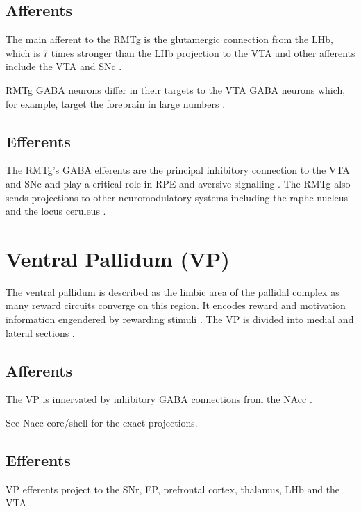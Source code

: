 \documentclass[12pt,a4paper]{article}
\begin{document}
\subsection{Afferents}

The main afferent to the RMTg is the glutamergic connection from the LHb, which is 7 times
stronger than the LHb projection to the VTA \citep{Barrot2012} and other afferents include
the VTA and SNc \citep{Lavezzi2011}.

RMTg GABA neurons differ in their targets to the VTA GABA neurons which, for example, target the forebrain in large numbers \citep{Barrot2012}. 

\subsection{Efferents}

The RMTg’s GABA efferents are the principal inhibitory connection to the VTA and SNc and play a critical role in RPE and aversive signalling \citep{Bourdy2012}. The RMTg also sends projections to other neuromodulatory systems including the raphe nucleus and the locus ceruleus \citep{Barrot2012} \citep{Hong2011}.



\section{Ventral Pallidum (VP)}

The ventral pallidum is described as the limbic area of the pallidal complex as
many reward circuits converge on this region. It encodes reward and motivation
information engendered by rewarding stimuli \citep{Smith2009}. The VP is divided into medial
and lateral sections \citep{Sesack2010}.

\subsection{Afferents}

The VP is innervated by inhibitory GABA connections from the
NAcc \citep{Basar2010}. 

See Nacc core/shell for the exact projections.

\subsection{Efferents}

VP efferents project to the SNr, EP, prefrontal cortex, thalamus, LHb and the VTA \citep{Groenewegen1993} \citep{Ikemoto2007}.
\end{document}
